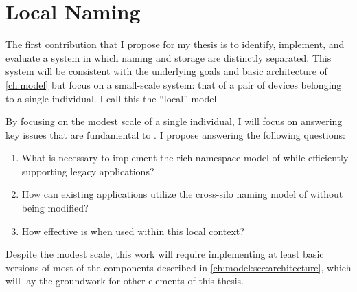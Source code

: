 
\chapter{Local Naming}
\label{ch:local}

The first contribution that I propose for my thesis is to identify,
implement, and evaluate a system in which naming and storage are distinctly
separated.  This system will be consistent with the underlying goals and basic
architecture of \autoref{ch:model} but focus on a small-scale system: that of a
pair of devices belonging to a single individual.  I call this the ``local''
model.

By focusing on the modest scale of a single individual, I will focus on
answering key issues that are fundamental to \system.  I propose answering the
following questions:

\begin{enumerate}
    \item What is necessary to implement the rich namespace model of \system
          while efficiently supporting legacy applications?
    \item How can existing applications utilize the cross-silo naming model of
          \system without being modified?
    \item How effective is \system when used within this local context?
\end{enumerate}

Despite the modest scale, this work will require implementing at least basic
versions of most of the components described in
\autoref{ch:model:sec:architecture}, which will lay the groundwork for other
elements of this thesis.
